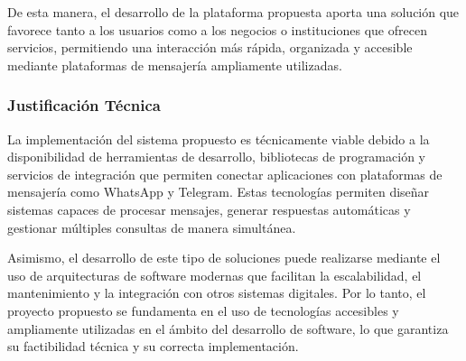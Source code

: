De esta manera, el desarrollo de la plataforma propuesta aporta una solución que favorece tanto a los usuarios como a los negocios o instituciones que ofrecen servicios, permitiendo una interacción más rápida, organizada y accesible mediante plataformas de mensajería ampliamente utilizadas.
\subsubsection{Justificación Técnica }

La implementación del sistema propuesto es técnicamente viable debido a la disponibilidad de herramientas de desarrollo, bibliotecas de programación y servicios de integración que permiten conectar aplicaciones con plataformas de mensajería como WhatsApp y Telegram. Estas tecnologías permiten diseñar sistemas capaces de procesar mensajes, generar respuestas automáticas y gestionar múltiples consultas de manera simultánea.

Asimismo, el desarrollo de este tipo de soluciones puede realizarse mediante el uso de arquitecturas de software modernas que facilitan la escalabilidad, el mantenimiento y la integración con otros sistemas digitales. Por lo tanto, el proyecto propuesto se fundamenta en el uso de tecnologías accesibles y ampliamente utilizadas en el ámbito del desarrollo de software, lo que garantiza su factibilidad técnica y su correcta implementación.
